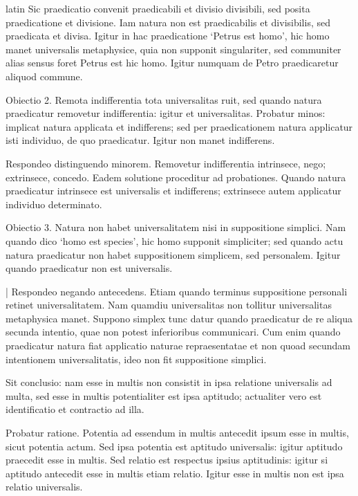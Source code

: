 \begin{otherlanguage*}{latin}
\pstart
Sic praedicatio convenit praedicabili et divisio divisibili, sed posita praedicatione et divisione. Iam natura non est praedicabilis et divisibilis, sed praedicata et divisa. Igitur in hac praedicatione `Petrus est homo', hic homo manet universalis metaphysice, quia non supponit singulariter, sed communiter alias sensus foret Petrus est hic homo. Igitur numquam de Petro praedicaretur aliquod commune. 
\pend

\pstart
Obiectio 2. Remota indifferentia tota universalitas ruit, sed quando natura praedicatur removetur indifferentia:
igitur et universalitas. Probatur minos:
implicat natura applicata et indifferens; sed per praedicationem natura applicatur isti individuo, de quo praedicatur. Igitur non manet indifferens. 
\pend

\pstart
Respondeo distinguendo minorem. Removetur indifferentia intrinsece, nego; extrinsece, concedo. Eadem solutione proceditur ad probationes. Quando natura praedicatur intrinsece est universalis et indifferens; extrinsece autem applicatur individuo determinato. 
\pend

\pstart
Obiectio 3. Natura non habet universalitatem nisi in suppositione simplici. Nam quando dico `homo est species', hic homo supponit simpliciter; sed quando actu natura praedicatur non habet suppositionem simplicem, sed personalem. Igitur quando praedicatur non est universalis. 
\pend

\pstart
\textnormal{|} Respondeo negando antecedens. Etiam quando terminus suppositione personali retinet universalitatem. Nam quamdiu universalitas non tollitur universalitas metaphysica manet. Suppono simplex tunc datur quando praedicatur de re aliqua secunda intentio, quae non potest inferioribus communicari. Cum enim quando praedicatur natura fiat applicatio naturae repraesentatae et non quoad secundam intentionem universalitatis, ideo non fit suppositione simplici. 
\pend

\pstart
Sit conclusio:
nam esse in multis non consistit in ipsa relatione universalis ad multa, sed esse in multis potentialiter est ipsa aptitudo; actualiter vero est identificatio et contractio ad illa. 
\pend

\pstart
Probatur ratione. Potentia ad essendum in multis antecedit ipsum esse in multis, sicut potentia actum. Sed ipsa potentia est aptitudo universalis:
igitur aptitudo praecedit esse in multis. Sed relatio est respectus ipsius aptitudinis:
igitur si aptitudo antecedit esse in multis etiam relatio. Igitur esse in multis non est ipsa relatio universalis. 
\pend


\end{otherlanguage*}
